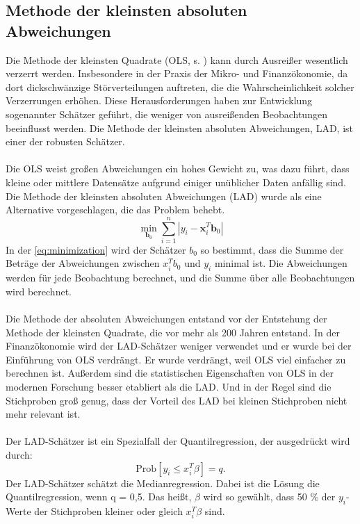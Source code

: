 \subsection{Methode der kleinsten absoluten Abweichungen}
\label{MethodeDerKleinstenAbsolutenAbweichungen}
Die Methode der kleinsten Quadrate (\ac{OLS}, s. ) kann durch Ausreißer wesentlich verzerrt werden. Insbesondere in der Praxis der Mikro- und Finanzökonomie, da dort dickschwänzige Störverteilungen auftreten, die die Wahrscheinlichkeit solcher Verzerrungen erhöhen. Diese Herausforderungen haben zur Entwicklung sogenannter  Schätzer geführt, die weniger von ausreißenden Beobachtungen beeinflusst werden. Die Methode der kleinsten absoluten Abweichungen, \ac{LAD}, ist einer der robusten Schätzer.\\\\
Die \ac{OLS} weist großen Abweichungen ein hohes Gewicht zu, was dazu führt, dass kleine oder mittlere Datensätze aufgrund einiger unüblicher Daten anfällig sind. Die Methode der kleinsten absoluten Abweichungen (\ac{LAD}) wurde als eine Alternative vorgeschlagen, die das Problem behebt. 
\begin{equation}
\label{eq:minimization}
\min_{\mathbf{b}_0} \sum_{i=1}^{n} \left| y_i - \mathbf{x}_i^T \mathbf{b}_0 \right|
\end{equation}
In der \autoref{eq:minimization} wird der Schätzer \(b_0\) so bestimmt, dass die Summe der Beträge der Abweichungen zwischen \(x_i^Tb_0\) und \(y_i\) minimal ist. Die Abweichungen werden für jede Beobachtung berechnet, und die Summe über alle Beobachtungen wird berechnet. \\\\
Die Methode der absoluten Abweichungen entstand vor der Entstehung der Methode der kleinsten Quadrate, die vor mehr als 200 Jahren entstand. In der Finanzökonomie wird der \ac{LAD}-Schätzer weniger verwendet und er wurde bei der Einführung von \ac{OLS} verdrängt. Er wurde verdrängt, weil \ac{OLS} viel einfacher zu berechnen ist. Außerdem sind die statistischen Eigenschaften von \ac{OLS} in der modernen Forschung besser etabliert als die \ac{LAD}. Und in der Regel sind die Stichproben groß genug, dass der Vorteil des \ac{LAD} bei kleinen Stichproben nicht mehr relevant ist. \\\\
Der \ac{LAD}-Schätzer ist ein Spezialfall der Quantilregression, der ausgedrückt wird durch: 
\begin{equation}
\label{eq:probability}
\text{Prob}[y_i \leq x_i^T\beta] = q.
\end{equation}
Der \ac{LAD}-Schätzer schätzt die Medianregression. Dabei ist die Lösung die Quantilregression, wenn q = 0,5. Das heißt, \(\beta\) wird so gewählt, dass 50 \% der \(y_i\)-Werte der Stichproben kleiner oder gleich \(x_i^T \beta\) sind. 
